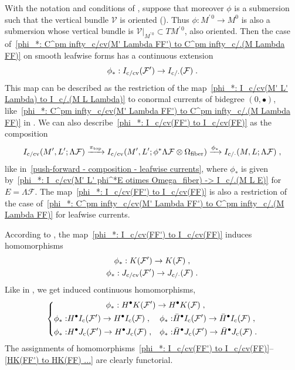 \documentclass{memo-l}
\theoremstyle{plain}
\theoremstyle{definition}
\theoremstyle{remark}
\newcommand{\FF}{\mathcal{F}}
\newcommand{\VV}{\mathcal{V}}
\newcommand{\fiber}{{\text{\rm fiber}}}
\newcommand{\topd}{{\text{\rm top}}}
\newcommand{\co}{{\text{\rm c}}}
\newcommand{\cv}{{\text{\rm cv}}}
\numberwithin{section}{chapter}
\numberwithin{equation}{section}%
\begin{document}
With the notation and conditions of , suppose that moreover $\phi$ is a submersion such that the vertical bundle $\VV$ is oriented (). Thus $\phi:M^{\prime\,0}\to M^0$ is also a submersion whose vertical bundle is $\VV|_{M^{\prime\,0}}\subset TM^{\prime\,0}$, also oriented. Then the case of~\eqref{phi_*: C^pm infty_c/cv(M' Lambda FF') to C^pm infty_c/.(M Lambda FF)} on smooth leafwise forms has a continuous extension
\begin{equation}\label{phi_*: I_c/cv(FF') to I_c/cv(FF)}
\phi_*:I_{\co/\cv}(\FF')\to I_{\co/{\cdot}}(\FF)\;.
\end{equation}
This map can be described as the restriction of the map~\eqref{phi_*: I_c/cv(M' L' Lambda) to I_c/.(M L Lambda)} to conormal currents of bidegree $(0,\bullet)$, like~\eqref{phi_*: C^pm infty_c/cv(M' Lambda FF') to C^pm infty_c/.(M Lambda FF)} in . We can also describe~\eqref{phi_*: I_c/cv(FF') to I_c/cv(FF)} as the composition
\[
I_{\co/\cv}(M',L';\Lambda\FF)\xrightarrow{\pi_\topd}I_{\co/\cv}(M',L';\phi^*\Lambda\FF\otimes\Omega_\fiber)
\xrightarrow{\phi_*}I_{\co/{\cdot}}(M,L;\Lambda\FF)\;,
\]
like in~\eqref{push-forward - composition - leafwise currents}, where $\phi_*$ is given by~\eqref{phi_*: I_c/cv(M' L' phi^*E otimes Omega_fiber) -> I_c/.(M L E)} for $E=\Lambda\FF$. The map~\eqref{phi_*: I_c/cv(FF') to I_c/cv(FF)} is also a restriction of the case of~\eqref{phi_*: C^pm infty_c/cv(M' Lambda FF') to C^pm infty_c/.(M Lambda FF)} for leafwise currents.

According to , the map~\eqref{phi_*: I_c/cv(FF') to I_c/cv(FF)} induces homomorphisms
\begin{gather}
\phi_*:K(\FF')\to K(\FF)\;,\label{phi_*:K(FF') to K(FF)}\\
\phi_*:J_{\co/\cv}(\FF')\to J_{\co/{\cdot}}(\FF)\;.\label{phi_*: J_c/cv(FF') to J_c/.(FF)}
\end{gather}
Like in , we get induced continuous homomorphisms,
\begin{equation}\label{HK(FF') to HK(FF) ...}
\left\{
\begin{gathered}
\phi_*:H^\bullet K(\FF')\to H^\bullet K(\FF)\;,\\
\begin{alignedat}{2}
\phi_*:&H^\bullet I_\co(\FF')\to H^\bullet I_\co(\FF)\;,&\quad
\phi_*:&\bar H^\bullet I_\co(\FF')\to\bar H^\bullet I_\co(\FF)\;,\\
\phi_*:&H^\bullet J_\co(\FF')\to H^\bullet J_\co(\FF)\;,&\quad
\phi_*:&\bar H^\bullet J_\co(\FF')\to\bar H^\bullet J_\co(\FF)\;.
\end{alignedat}
\end{gathered}
\right.
\end{equation} 
The assignments of homomorphisms~\eqref{phi_*: I_c/cv(FF') to I_c/cv(FF)}--\eqref{HK(FF') to HK(FF) ...} are clearly functorial. 
\end{document}
